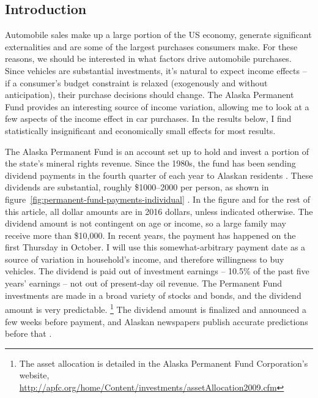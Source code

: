 \documentclass[11pt,letterpaper,oneside]{article}
\begin{document}
\begin{doublespacing}
\section{Introduction}

Automobile sales make up a large portion of the US economy, generate significant externalities and are some of the largest purchases consumers make.
For these reasons, we should be interested in what factors drive automobile purchases.
Since vehicles are substantial investments, it's natural to expect income effects -- if a consumer's budget constraint is relaxed (exogenously and without anticipation), their purchase decisions should change.
The  Alaska Permanent Fund provides an interesting source of income variation, allowing me to look at a few aspects of the income effect in car purchases.
In the results below, I find statistically insignificant and economically small effects for most results.

The Alaska Permanent Fund is an account set up to hold and invest a portion of the state's mineral rights revenue.
Since the 1980s, the fund has been sending dividend payments in the fourth quarter of each year to Alaskan residents \parencite{hsieh2003}.
These dividends are substantial, roughly \$1000--2000 per person, as shown in figure~\ref{fig:permanent-fund-payments-individual} \parencite{apfd_payments_summary}.
In the figure and for the rest of this article, all dollar amounts are in 2016 dollars, unless indicated otherwise.
The dividend amount is not contingent on age or income, so a large family may receive more than \$10,000.
In recent years, the payment has happened on the first Thursday in October.
I will use this somewhat\hyp{}arbitrary payment date as a source of variation in household's income, and therefore willingness to buy vehicles.
The dividend is paid out of investment earnings -- 10.5\% of the past five years' earnings -- not out of present\hyp{}day oil revenue.
The Permanent Fund investments are made in a broad variety of stocks and bonds, and the dividend amount is very predictable.
\footnote{The asset allocation is detailed in the Alaska Permanent Fund Corporation's website, \url{http://apfc.org/home/Content/investments/assetAllocation2009.cfm}}
The dividend amount is finalized and announced a few weeks before payment, and Alaskan newspapers publish accurate predictions before that \parencite{adn_dividend_prediction, adn_dividend_realization}.


\end{doublespacing}
\end{document}
